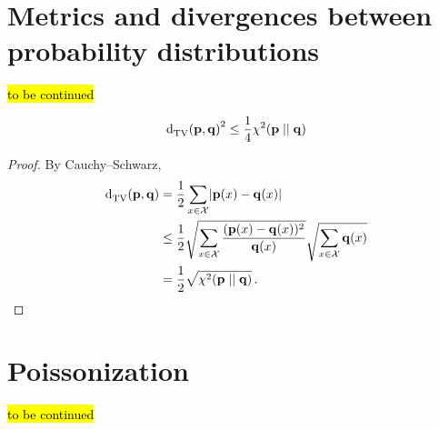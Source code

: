 \documentclass[biber]{nowfnt} %
\newcommand{\tbc}{\noindent\hl{\sc{}to be continued}\xspace}
\begin{document}
\chapter{Metrics and divergences between probability distributions}
  \label{app:distances}
\tbc
{}
\begin{lemma}
  \label{app:distances:chi2:tv}
  \[
    \totalvardist{\p}{\q}^2 \leq \frac{1}{4}\chisquare{\p}{\q}
  \]
\end{lemma}
\begin{proof}
  By Cauchy--Schwarz, 
  \begin{align*}
      \totalvardist{\p}{\q} &= \frac{1}{2}\sum_{x\in\domain} \abs{\p(x)-\q(x)} \\
      &\leq \frac{1}{2}\sqrt{\sum_{x\in\domain} \frac{(\p(x)-\q(x))^2}{\q(x)}}\sqrt{\sum_{x\in\domain} \q(x)} \\
      &= \frac{1}{2}\sqrt{\chisquare{\p}{\q}}\,.
  \end{align*}
\end{proof}

\chapter{Poissonization}
  \label{app:poissonization}
\tbc

\backmatter  %

\printbibliography
\end{document}
